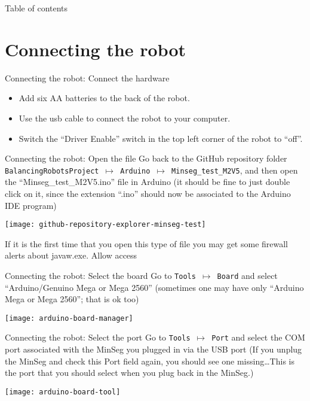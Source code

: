 \begin{frame}{Table of contents}
	\tableofcontents
\end{frame}

\section{Connecting the robot}
\begin{frame}{Connecting the robot: Connect the hardware}
	\begin{itemize}
		\item Add six AA batteries to the back of the robot.
		\item Use the usb cable to connect the robot to your computer. 
		\item Switch the ``Driver Enable'' switch in the top left corner of the robot to ``off''.
		\end{itemize}
\end{frame}

\begin{frame}{Connecting the robot: Open the file}
	Go back to the GitHub repository folder \texttt{BalancingRobotsProject $\mapsto$ Arduino $\mapsto$ Minseg\_test\_M2V5}, and then open the ``Minseg\_test\_M2V5.ino'' file in Arduino (it should be fine to just double click on it, since the extension ``.ino'' should now be associated to the Arduino IDE program)
	\begin{center}
		\texttt{[image: github-repository-explorer-minseg-test]}
	\end{center}
	If it is the first time that you open this type of file you may get some firewall alerts about javaw.exe. Allow access
\end{frame}


\begin{frame}{Connecting the robot: Select the board}
	Go to \texttt{Tools $\mapsto$ Board} and select ``Arduino/Genuino Mega or Mega 2560'' (sometimes one may have only ``Arduino Mega or Mega 2560''; that is ok too)
	\begin{center}
		\texttt{[image: arduino-board-manager]}
	\end{center}
\end{frame}


\begin{frame}{Connecting the robot: Select the port}
	Go to \texttt{Tools $\mapsto$ Port} and select the COM port associated with the MinSeg you plugged in via the USB port (If you unplug the MinSeg and check this Port field again, you should see one missing\ldots This is the port that you should select when you plug back in the MinSeg.)
	\begin{center}
		\texttt{[image: arduino-board-tool]}
	\end{center}
\end{frame}

